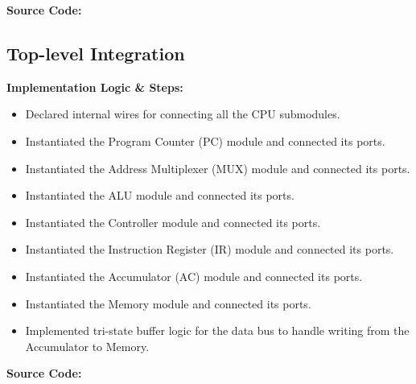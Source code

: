 \textbf{Source Code:}

\subsection{Top-level Integration}
\textbf{Implementation Logic \& Steps:}
\begin{itemize}
	\item Declared internal wires for connecting all the CPU submodules.
	\item Instantiated the Program Counter (PC) module and connected its ports.
	\item Instantiated the Address Multiplexer (MUX) module and connected its ports.
	\item Instantiated the ALU module and connected its ports.
	\item Instantiated the Controller module and connected its ports.
	\item Instantiated the Instruction Register (IR) module and connected its ports.
	\item Instantiated the Accumulator (AC) module and connected its ports.
	\item Instantiated the Memory module and connected its ports.
	\item Implemented tri-state buffer logic for the data bus to handle writing from the Accumulator to Memory.
\end{itemize}

\textbf{Source Code:}
